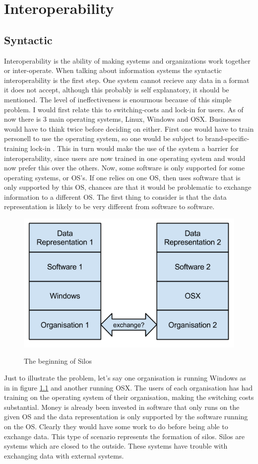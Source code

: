 \chapter{Interoperability}
\section{Syntactic}
Interoperability is the ability of making systems and organizations work together or inter-operate. When talking about information systems the syntactic interoperability is the first step.
One system cannot recieve any data in a format it does not accept, although this probably is self explanatory, it should be mentioned.
The level of ineffectiveness is enourmous because of this simple problem. I would first relate this to switching-costs and lock-in for users. As of now there is 3 main operating systems, Linux, Windows and OSX. Businesses would have to think twice before deciding on either. First one would have to train personell to use the operating system, so one would be subject to brand-specific-training lock-in \cite{15}. This in turn would make the use of the system a barrier for interoperability, since users are now trained in one operating system and would now prefer this over the others. Now, some software is only supported for some operating systems, or OS's. If one relies on one OS, then uses software that is only supported by this OS, chances are that it would be problematic to exchange information to a different OS. The first thing to consider is that the data representation is likely to be very different from software to software. 
\begin{figure}
\centering
\includegraphics[width=12cm]{litterature/images/begin_silo}
\label{begin_silo}
\caption{The beginning of Silos}
\end{figure}
Just to illustrate the problem, let's say one organisation is running Windows as in in figure \ref{begin_silo} and another running OSX. The users of each organisation has had training on the operating system of their organisation, making the switching costs substantial. Money is already been invested in software that only runs on the given OS and the data representation is only supported by the software running on the OS. Clearly they would have some work to do before being able to exchange data. This type of scenario represents the formation of silos. Silos are systems which are closed to the outside. These systems have trouble with exchanging data with external systems. 

